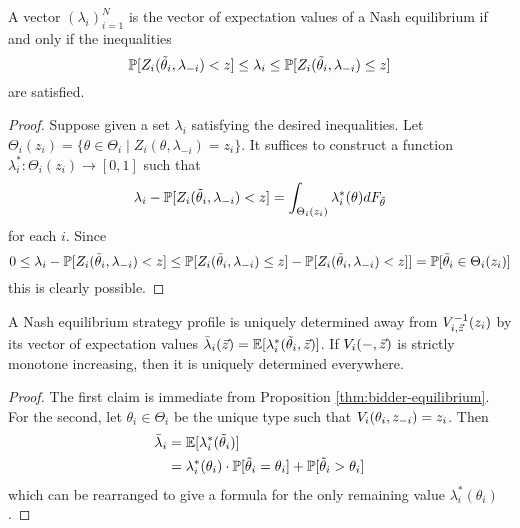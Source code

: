 \begin{corollary}
  \label{thm:expected-equilibria-existence}

  A vector $(\lambda_i)_{i=1}^N$ is the vector of expectation values of a Nash equilibrium if and only if the inequalities
  \[
    \mathbb{P}[Z_i(\tilde\theta_i,\lambda_{-i}) < z] \leq \lambda_i \leq \mathbb{P}[Z_i(\tilde\theta_i,\lambda_{-i}) \leq z]
  \]
  are satisfied.

\end{corollary}
%
\begin{proof}
  
  Suppose given a set $\lambda_i$ satisfying the desired inequalities.
  Let $\Theta_i(z_i)=\{\theta\in\Theta_i \mid Z_i(\theta,\lambda_{-i}) = z_i\}$.
  It suffices to construct a function $\lambda^*_i:\Theta_i(z_i)\rightarrow[0,1]$ such that
  \[
    \lambda_i - \mathbb{P}[Z_i(\tilde\theta_i,\lambda_{-i}) < z] = \int_{\Theta_i(z_i)} \lambda_i^*(\theta)dF_{\tilde\theta}
  \]
  for each $i$.
  Since 
  \[
    0 \leq \lambda_i - \mathbb{P}[Z_i(\tilde\theta_i,\lambda_{-i}) < z] \leq \mathbb{P}[Z_i(\tilde\theta_i,\lambda_{-i}) \leq z] - \mathbb{P}[Z_i(\tilde\theta_i,\lambda_{-i}) < z] ]= \mathbb{P}[\tilde\theta_i\in \Theta_i(z_i)]
  \]
  this is clearly possible.
  \qedhere

\end{proof}

\begin{corollary}
  \label{thm:expected-equilibrium-uniqueness}

  A Nash equilibrium strategy profile is uniquely determined away from $V_{i,\vec{z}}^{-1}(z_i)$ by its vector of expectation values $\bar\lambda_i(\vec{z})=\mathbb{E}[\lambda_i^*(\tilde\theta_i,\vec{z})]$.
  If $V_i(-,\vec{z})$ is strictly monotone increasing, then it is uniquely determined everywhere.

\end{corollary}
%
\begin{proof}

  The first claim is immediate from Proposition \ref{thm:bidder-equilibrium}.
  For the second, let $\theta_i\in\Theta_i$ be the unique type such that $V_i(\theta_i,z_{-i})=z_i$.
  Then
  \begin{align*}
    \bar\lambda_i  &= \mathbb{E}[\lambda^*_i(\tilde\theta_i)] \\
    &= \lambda^*_i(\theta_i)\cdot\mathbb{P}[\tilde\theta_i=\theta_i] + \mathbb{P}[\tilde\theta_i>\theta_i]
  \end{align*}
  which can be rearranged to give a formula for the only remaining value $\lambda^*_i(\theta_i)$. 
  \qedhere

\end{proof}

